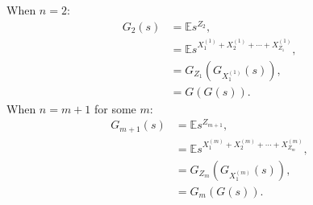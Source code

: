 \documentclass{huhtakm-template-book-v2}
\newcommand{\expect}{\mathbb{E}}
\begin{document}
    \begin{proofing}
        When $n = 2$:
        \begin{align*}
            G_{2}(s) &= \expect{s^{Z_{2}}},\\
            &= \expect{s^{X_{1}^{(1)}+X_{2}^{(1)}+\cdots+X_{Z_{1}}^{(1)}}},\\
            &= G_{Z_{1}}\left(G_{X_{1}^{(1)}}(s)\right),\\
            &= G(G(s)).
        \end{align*}
        When $n = m+1$ for some $m$:
        \begin{align*}
            G_{m+1}(s) &= \expect{s^{Z_{m+1}}},\\
            &= \expect{s^{X_{1}^{(m)}+X_{2}^{(m)}+\cdots+X_{Z_{m}}^{(m)}}},\\
            &= G_{Z_{m}}\left(G_{X_{1}^{(m)}}(s)\right),\\
            &= G_{m}(G(s)).
        \end{align*}
    \end{proofing}
    \newpage
\end{document}
